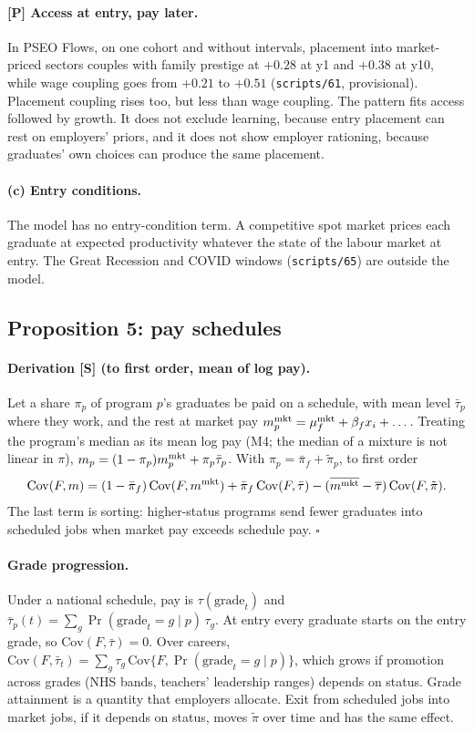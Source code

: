 \documentclass[11pt]{article}
\begin{document}
\paragraph{[P] Access at entry, pay later.} In PSEO Flows, on one cohort and without intervals, placement into
market-priced sectors couples with family prestige at $+0.28$ at y1 and $+0.38$ at y10, while wage coupling goes
from $+0.21$ to $+0.51$ (\texttt{scripts/61}, provisional). Placement coupling rises too, but less than wage
coupling. The pattern fits access followed by growth. It does not exclude learning, because entry placement can
rest on employers' priors, and it does not show employer rationing, because graduates' own choices can produce the
same placement.

\paragraph{(c) Entry conditions.} The model has no entry-condition term. A competitive spot market prices each
graduate at expected productivity whatever the state of the labour market at entry. The Great Recession and COVID
windows (\texttt{scripts/65}) are outside the model.

\subsection{Proposition 5: pay schedules}\label{si:theory:schedules}

\paragraph{Derivation [S] (to first order, mean of log pay).} Let a share $\pi_p$ of program $p$'s graduates be
paid on a schedule, with mean level $\bar\tau_p$ where they work, and the rest at market pay
$m^{\rm mkt}_p=\mu^{\rm mkt}_f+\beta_fx_i+\dots$. Treating the program's median as its mean log pay (M4; the median
of a mixture is not linear in $\pi$), $m_p=(1-\pi_p)m^{\rm mkt}_p+\pi_p\bar\tau_p$. With
$\pi_p=\bar\pi_f+\tilde\pi_p$, to first order
\[
\mathrm{Cov}(F,m)=(1-\bar\pi_f)\,\mathrm{Cov}(F,m^{\rm mkt})+\bar\pi_f\,\mathrm{Cov}(F,\bar\tau)
-(\overline{m^{\rm mkt}}-\overline{\tau})\,\mathrm{Cov}(F,\tilde\pi) .
\]
The last term is sorting: higher-status programs send fewer graduates into scheduled jobs when market pay exceeds
schedule pay. $\square$

\paragraph{Grade progression.} Under a national schedule, pay is $\tau(\text{grade}_t)$ and
$\bar\tau_p(t)=\sum_g\Pr(\text{grade}_t=g\mid p)\,\tau_g$. At entry every graduate starts on the entry grade, so
$\mathrm{Cov}(F,\bar\tau)=0$. Over careers,
$\mathrm{Cov}(F,\bar\tau_t)=\sum_g\tau_g\,\mathrm{Cov}\{F,\Pr(\text{grade}_t=g\mid p)\}$, which grows if promotion
across grades (NHS bands, teachers' leadership ranges) depends on status. Grade attainment is a quantity that
employers allocate. Exit from scheduled jobs into market jobs, if it depends on status, moves $\tilde\pi$ over
time and has the same effect.
\end{document}
